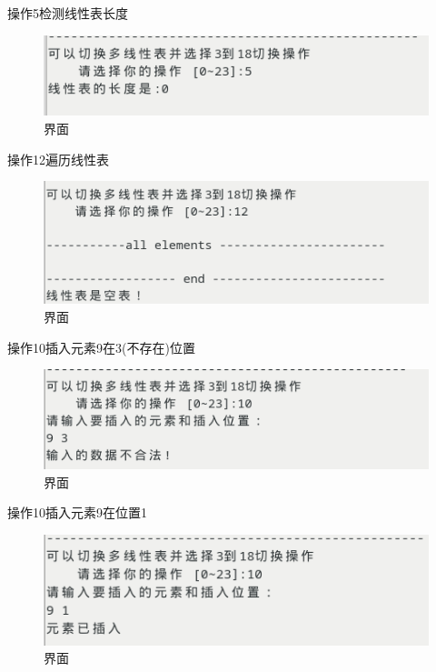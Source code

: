 \documentclass[supercite]{Experimental_Report}
\theoremstyle{definition}
\begin{document}
操作5检测线性表长度

\begin{figure}[!htb]
	\begin{center}
		\includegraphics[scale=0.60]{images/1-9.png}
		\caption{界面}
		\label{fig1-7}
		\end{center}
\end{figure}

操作12遍历线性表

\begin{figure}[!htb]
	\begin{center}
		\includegraphics[scale=0.60]{images/1-10.png}
		\caption{界面}
		\label{fig1-8}
		\end{center}
\end{figure}


操作10插入元素9在3(不存在)位置

\begin{figure}[!htb]
	\begin{center}
		\includegraphics[scale=0.60]{images/1-6.png}
		\caption{界面}
		\label{fig1-9}
		\end{center}
\end{figure}

操作10插入元素9在位置1

\begin{figure}[!htb]
	\begin{center}
		\includegraphics[scale=0.60]{images/1-7.png}
		\caption{界面}
		\label{fig1-10}
		\end{center}
\end{figure}
\end{document}
